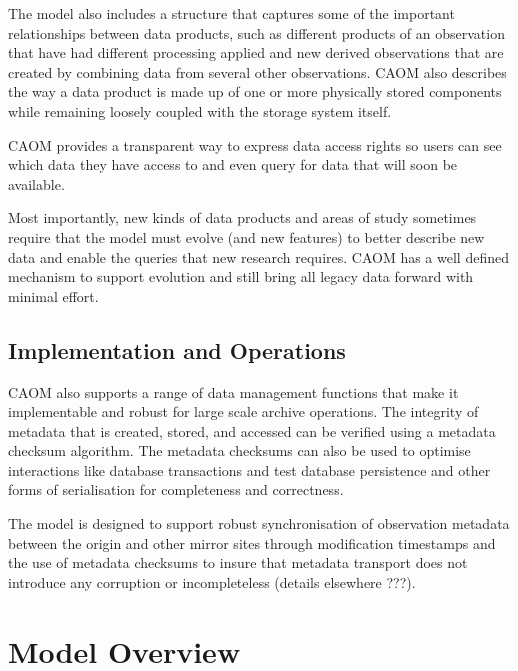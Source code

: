 \documentclass[11pt,a4paper]{ivoa}
\begin{document}
The model also includes a structure that captures some of the important relationships 
between data products, such as different products of an observation that have had
different processing applied and new derived observations that are created by 
combining data from several other observations. CAOM also describes the way a
data product is made up of one or more physically stored components while remaining
loosely coupled with the storage system itself.

CAOM provides a transparent way to express data access rights so users can see
which data they have access to and even query for data that will soon be available.

Most importantly, new kinds of data products and areas of study sometimes require 
that the model must evolve (and new features) to better describe new data and enable
the queries that new research requires. CAOM has a well defined mechanism to support
evolution and still bring all legacy data forward with minimal effort.

\subsection{Implementation and Operations}

CAOM also supports a range of data management functions that make it implementable
and robust for large scale archive operations. The integrity of metadata that is 
created, stored, and accessed can be verified using a metadata checksum algorithm.
The metadata checksums can also be used to optimise interactions like database 
transactions and test database persistence and other forms of serialisation for
completeness and correctness.

The model is designed to support robust synchronisation of observation metadata 
between the origin and other mirror sites through modification timestamps and 
the use of metadata checksums to insure that metadata transport does not introduce
any corruption or incompleteless (details elsewhere ???).

\section{Model Overview}
\end{document}
